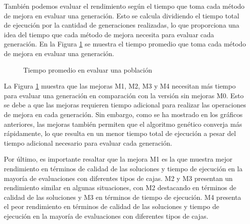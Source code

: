 También podemos evaluar el rendimiento según el tiempo que toma cada método de mejora en evaluar una generación. Esto se calcula dividiendo el tiempo total de ejecución por la cantidad de generaciones realizadas, lo que proporciona una idea del tiempo que cada método de mejora necesita para evaluar cada generación. En la Figura \ref{fig:tiempo_generacion} se muestra el tiempo promedio que toma cada método de mejora en evaluar una generación.

\begin{figure}[H]
    \centering
    
    \caption{Tiempo promedio en evaluar una población}
    \label{fig:tiempo_generacion}
\end{figure}

La Figura \ref{fig:tiempo_generacion} muestra que las mejoras M1, M2, M3 y M4 necesitan más tiempo para evaluar una generación en comparación con la versión sin mejoras M0. Esto se debe a que las mejoras requieren tiempo adicional para realizar las operaciones de mejora en cada generación. Sin embargo, como se ha mostrado en los gráficos anteriores, las mejoras también permiten que el algoritmo genético converja más rápidamente, lo que resulta en un menor tiempo total de ejecución a pesar del tiempo adicional necesario para evaluar cada generación.

Por último, es importante resaltar que la mejora M1 es la que muestra mejor rendimiento en términos de calidad de las soluciones y tiempo de ejecución en la mayoría de evaluaciones con diferentes tipos de cajas. M2 y M3 presentan un rendimiento similar en algunas situaciones, con M2 destacando en términos de calidad de las soluciones y M3 en términos de tiempo de ejecución. M4 presenta el peor rendimiento en términos de calidad de las soluciones y tiempo de ejecución en la mayoría de evaluaciones con diferentes tipos de cajas.
